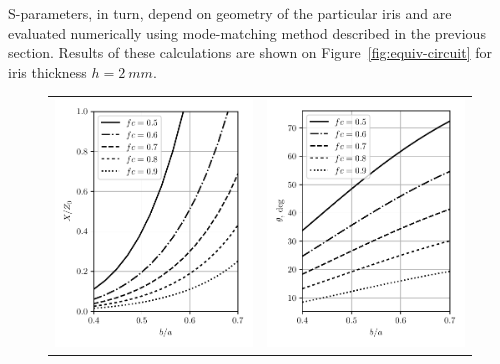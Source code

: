 \documentclass{pj}
\begin{document}
S-parameters, in turn, depend on geometry of the particular iris and
are evaluated numerically using mode-matching method described in
the previous section. Results of these calculations are shown on
Figure~\ref{fig:equiv-circuit} for iris thickness $h = 2~mm$.

\begin{figure}[h]
  \begin{tabular}{cc}
    \includegraphics{images/impedance} &
                                           \includegraphics{images/theta}

\end{tabular}
\end{figure}
\end{document}
